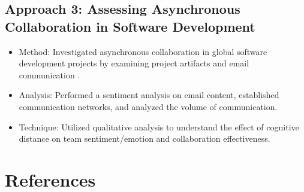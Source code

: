 \documentclass[12pt]{article}
\begin{document}
\subsection{Approach 3: Assessing Asynchronous Collaboration in Software Development}
\begin{itemize}
  \item Method: Investigated asynchronous collaboration in global software development projects by examining project artifacts and email communication \cite{ref3}.
  \item Analysis: Performed a sentiment analysis on email content, established communication networks, and analyzed the volume of communication.
  \item Technique: Utilized qualitative analysis to understand the effect of cognitive distance on team sentiment/emotion and collaboration effectiveness.
\end{itemize}


\section*{References}
\vspace*{-35pt}
\renewcommand{\refname}{}
\end{document}
